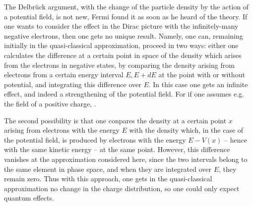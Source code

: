 \documentclass{article}
\begin{document}
The Delbr\"uck argument, with the change of the particle density by the action of a potential field, is not new, Fermi found it as soon as he heard of the theory. If one wants to consider the effect in the Dirac picture with the infinitely-many negative electrons, then one gets no unique result. Namely, one can, remaining initially in the quasi-classical approximation, proceed in two ways: either one calculates the difference at a certain point in space of the density which arises from the electrons in negative states, by comparing the density arising from electrons from a certain energy interval $E,E+{dE}$ at the point with or without potential, and integrating this difference over $E$. In this case one gets an infinite effect, and indeed  a strengthening of the potential field. For if one assumes e.g. the field of a positive charge, .

The second possibility is that one conpares the density at a certain point $x$ arising from electrons with the energy $E$ with the density which, in the case of the potential field, is produced by electrons with the energy $E - V(x)$ -- hence with the same kinetic energy -- at the same point. However, this difference vanishes at the approximation considered here, since the two intervals belong to the same element in phase space, and when they are integrated over $E$, they remain zero. Thus with this approach, one gets in the quasi-classical approximation no change in the charge distribution, so one could only expect quantum effects.
\end{document}
